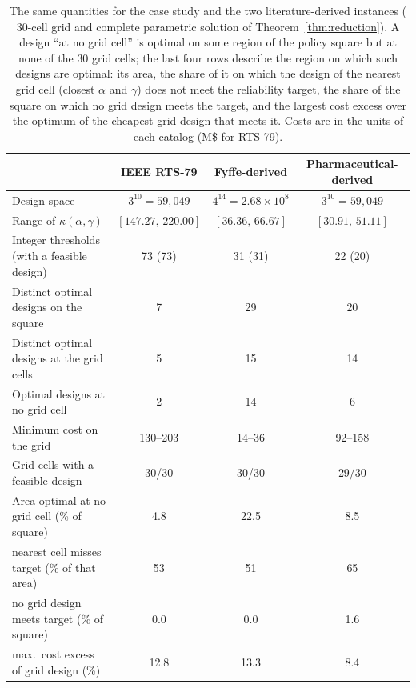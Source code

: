 \begin{table}[!htbp]
\centering
\caption{The same quantities for the case study and the two literature-derived instances ($30$-cell grid and complete parametric solution of Theorem~\ref{thm:reduction}). A design ``at no grid cell'' is optimal on some region of the policy square but at none of the $30$ grid cells; the last four rows describe the region on which such designs are optimal: its area, the share of it on which the design of the nearest grid cell (closest $\alpha$ and $\gamma$) does not meet the reliability target, the share of the square on which no grid design meets the target, and the largest cost excess over the optimum of the cheapest grid design that meets it. Costs are in the units of each catalog (M\$ for RTS-79).}
\label{tab:replication}
\small
\begin{tabular}{lccc}
\hline
 & IEEE RTS-79 & Fyffe-derived & Pharmaceutical-derived\\
\hline
Design space & $3^{10} = 59{,}049$ & $4^{14} = 2.68\times10^{8}$ & $3^{10} = 59{,}049$\\
Range of $\kappa(\alpha,\gamma)$ & $[147.27,\,220.00]$ & $[36.36,\,66.67]$ & $[30.91,\,51.11]$\\
Integer thresholds (with a feasible design) & 73 (73) & 31 (31) & 22 (20)\\
Distinct optimal designs on the square & 7 & 29 & 20\\
Distinct optimal designs at the grid cells & 5 & 15 & 14\\
Optimal designs at no grid cell & 2 & 14 & 6\\
Minimum cost on the grid & 130--203 & 14--36 & 92--158\\
Grid cells with a feasible design & 30/30 & 30/30 & 29/30\\
\hline
Area optimal at no grid cell (\% of square) & 4.8 & 22.5 & 8.5\\
\quad nearest cell misses target (\% of that area) & 53 & 51 & 65\\
\quad no grid design meets target (\% of square) & 0.0 & 0.0 & 1.6\\
\quad max.\ cost excess of grid design (\%) & 12.8 & 13.3 & 8.4\\
\hline
\end{tabular}
\end{table}
